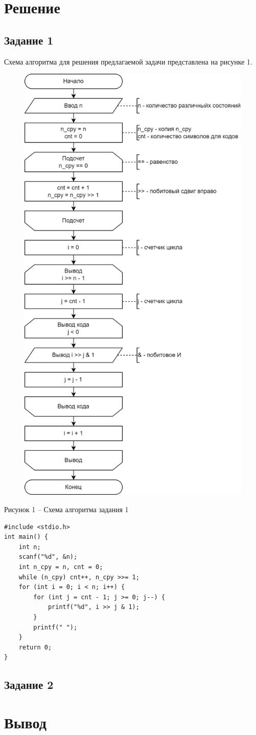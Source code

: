 \documentclass[a4paper,14pt]{extarticle}
\begin{document}
	\newpage
	\section*{Решение}
	\subsection*{Задание 1}
	Схема алгоритма для решения предлагаемой задачи представлена на рисунке 1.
	\begin{figure}[h]
		\centering
		\includegraphics[width=0.6\linewidth]{schemes/s-1}
	\end{figure}
	\begin{center}
		Рисунок 1 – Схема алгоритма задания 1
	\end{center}
	
	\pagebreak
	\begin{lstlisting}[tabsize=2,basicstyle=\ttfamily]
#include <stdio.h>
int main() {
	int n;
	scanf("%d", &n);
	int n_cpy = n, cnt = 0;
	while (n_cpy) cnt++, n_cpy >>= 1;
	for (int i = 0; i < n; i++) {
		for (int j = cnt - 1; j >= 0; j--) {
			printf("%d", i >> j & 1);
		}
		printf(" ");
	}
	return 0;
}
	\end{lstlisting}
	
	\newpage
	\subsection*{Задание 2}

	\section*{Вывод}
	
\end{document}
